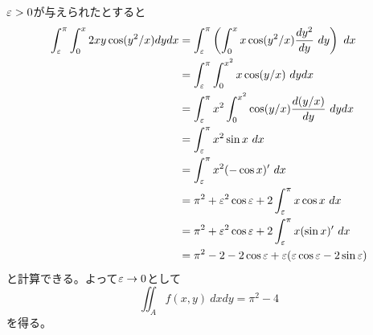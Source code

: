\newpage

\subsubsection{}%
\begin{sol}
  ${\varepsilon} > 0$が与えられたとすると
  \begin{align*}
    \int_{{\varepsilon}}^{\pi} \int_0^x 2 xy \cos(y^2/x)  dy  dx &=   \int_{{\varepsilon}}^{\pi} \left(  \int_0^x  x \cos(y^2/x) \frac{d y^2}{dy} \ dy \right)  \  dx \\
     &=   \int_{{\varepsilon}}^{\pi} \int_0^{x^2} x  \cos(y/x) \ dy dx \\
    &= \int_{{\varepsilon}}^{\pi} x^2 \int_0^{x^2}   \cos(y/x)  \frac{d(y/x)}{dy} \ dy dx \\
    &=  \int_{{\varepsilon}}^{\pi} x^2 \sin x \ dx \\
    &= \int_{{\varepsilon}}^{\pi} x^2 (- \cos x)' \ dx \\
    &= \pi^2 + {\varepsilon}^2 \cos {\varepsilon} + 2  \int_{{\varepsilon}}^{\pi} x \cos x \ dx \\
    &= \pi^2 + {\varepsilon}^2 \cos {\varepsilon} + 2  \int_{{\varepsilon}}^{\pi} x (\sin x)' \ dx \\
    &= \pi^2 - 2 -  2\cos {\varepsilon} + {\varepsilon}( {\varepsilon} \cos {\varepsilon} - 2  \sin {\varepsilon} )
  \end{align*}
  と計算できる。よって${\varepsilon} \to 0$として
  \[
  \iint_A f(x,y) \ dx dy = \pi^2 - 4
  \]
  を得る。
\end{sol}

\newpage

